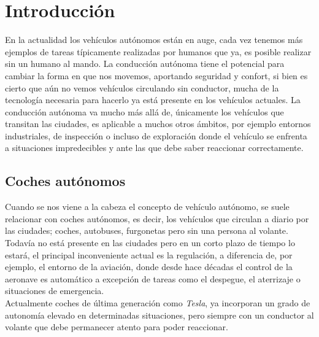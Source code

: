 \chapter{Introducción}
\label{cap:capitulo1}
\setcounter{page}{1}

En la actualidad los vehículos autónomos están en auge, cada vez tenemos más ejemplos de tareas típicamente realizadas por humanos que ya, es posible realizar sin un humano al mando. La conducción autónoma tiene el potencial para cambiar la forma en que nos movemos, aportando seguridad y confort, si bien es cierto que aún no vemos vehículos circulando sin conductor, mucha de la tecnología necesaria para hacerlo ya está presente en los vehículos actuales. La conducción autónoma va mucho más allá de, únicamente los vehículos que transitan las ciudades, es aplicable a muchos otros ámbitos, por ejemplo entornos industriales, de inspección o incluso de exploración donde el vehículo se enfrenta a situaciones impredecibles y ante las que debe saber reaccionar correctamente.\\

\section{Coches autónomos}
\label{sec:cochesautonomos} %
Cuando se nos viene a la cabeza el concepto de vehículo autónomo, se suele relacionar con coches autónomos, es decir, los vehículos que circulan a diario por las ciudades; coches, autobuses, furgonetas pero sin una persona al volante. Todavía no está presente en las ciudades pero en un corto plazo de tiempo lo estará, el principal inconveniente actual es la regulación, a diferencia de, por ejemplo, el entorno de la aviación, donde desde hace décadas el control de la aeronave es automático a excepción de tareas como el despegue, el aterrizaje o situaciones de emergencia.\\

Actualmente coches de última generación como \textit{Tesla}, ya incorporan un grado de autonomía elevado en determinadas situaciones, pero siempre con un conductor al volante que debe permanecer atento para poder reaccionar.\\

